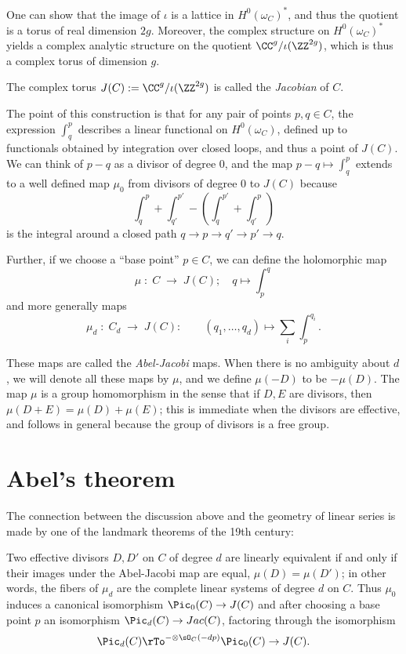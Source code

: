 One can show that the image of $\iota$ is a lattice in $H^0(\omega_C)^*$, and thus the quotient
is a torus of real dimension $2g$. Moreover, the
complex structure on $H^0(\omega_C)^*$ yields a complex analytic structure on the quotient $\CC^{g}/\iota(\ZZ^{2g})$, which is thus a complex torus of  dimension $g$.  

\begin{definition}
 The complex torus $J(C) := \CC^{g}/\iota(\ZZ^{2g})$ is called the \emph{Jacobian} of $C$.
\end{definition}

The point of this construction is that for any pair of points $p, q \in C$, the expression $\int_q^p$ describes a linear functional on $H^0(\omega_C)$, defined up to functionals obtained by integration over closed loops, and thus a point of $J(C)$. We can think of $p-q$ as a divisor of
degree 0, and the map $p-q \mapsto \int_q^p$ extends to a well defined map $\mu_0$ from divisors of degree 0 to $J(C)$ because
$$
\int_q^p +\int_{q'}^{p'} - (\int_q^{p'} +\int_{q'}^p) 
$$
is the integral around a closed path $q\to p\to q'\to p' \to q$.

Further, if we choose a ``base point''  $p\in C$, we can define the holomorphic map
$$
\mu \; : \; C \; \to \; J(C); \quad q\mapsto \int_{p}^{q}
$$
and more generally maps
$$
\mu_d \; : \; C_d \; \to \; J(C): \quad  \quad (q_1,\dots, q_d) \mapsto \sum_i \int_{p}^{q_i}.
$$

These maps are called the \emph{Abel-Jacobi} maps. When there is no ambiguity about $d$, we will denote all these maps  by $\mu$,  and  
we define $\mu(-D)$ to be $-\mu(D)$. 
The map $\mu$ is a group homomorphism in the sense that if $D, E$ are divisors, then
$\mu (D+E) = \mu(D) + \mu(E)$; this is immediate when the divisors are effective, and 
follows in general because the group of divisors is a free group.

\section{Abel's theorem}
 The connection between the discussion above and the geometry of linear series is made by one of the landmark theorems of the 19th century:

\begin{theorem}\label{abel}
Two effective divisors $D, D'$ on $C$ of degree $d$ are linearly equivalent if and only if their images under the Abel-Jacobi map are equal, $\mu(D) = \mu(D')$; in other words, the fibers of $\mu_d$ are the complete linear systems of degree $d$ on $C$. Thus $\mu_0$ induces a canonical isomorphism
$\Pic_0(C) \to J(C)$ and after choosing a base point $p$ an isomorphism $\Pic_d(C) \to Jac(C)$, factoring through the isomorphism
$$
\Pic_d(C) \rTo^{-\otimes \sO_C(-dp)} \Pic_0(C) \to J(C).
$$
\end{theorem}

